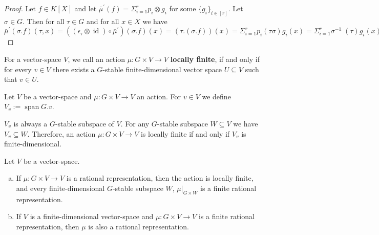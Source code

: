 \begin{proof}
  Let $f \in K[X]$ and let $ \bar{\mu}^\prime (f) = \Sigma_{i=1}^r p_i \otimes g_i$ for some $\{g_i\}_{i \in [r]}$.
  Let $\sigma \in G$.
  Then for all $\tau \in G$ and for all $x \in X$ we have $ \bar{\mu}^\prime (\sigma.f) (\tau,x) = ((\epsilon_\tau \otimes \operatorname{id}) \circ \bar{\mu}^\prime) (\sigma.f) (x) = (\tau.(\sigma.f)) (x) = \Sigma_{i=1}^r p_i(\tau\sigma) g_i(x) = \Sigma_{i=1}^r \sigma^{-1}\dot{\phantom{.}}(\tau) g_i(x) = (\Sigma_{i=1}^r \sigma^{-1} \dot{\phantom{.}}p_i \otimes g_i) (\tau,x)$
\end{proof}

\begin{definition}
  For a vector-space $V$, we call an action $\mu \colon G \times V \longrightarrow V$ \textbf{locally finite}, if and only if for every $v \in V$ there exists a $G$-stable finite-dimensional vector space $U \subseteq V$ such that $v \in U$.
\end{definition}

\begin{definition}
  Let $V$ be a vector-space and $\mu \colon G \times V \longrightarrow V$ an action.
  For $v \in V$ we define $V_v := \operatorname{span} G.v$.
\end{definition}

\begin{remark}
  $V_v$ is always a $G$-stable subspace of $V$.
  For any $G$-stable subspace $W \subseteq V$ we have $V_v \subseteq W$.
  Therefore, an action $\mu \colon G \times V \longrightarrow V$ is locally finite if and only if $V_v$ is finite-dimensional.
\end{remark}

\begin{proposition}\label{locfin}
  Let $V$ be a vector-space.
  \begin{enumerate}[(a)]
  \item If $\mu \colon G \times V \longrightarrow V$ is a rational
    representation, then the action is locally finite, and every
    finite-dimensional $G$-stable subspace $W$,
    $\left. \mu \right|_{G\times W}$ is a finite rational
    representation.
  \item If $V$ is a finite-dimensional vector-space and $\mu \colon G \times V \longrightarrow V$ is a finite rational representation, then $\mu$ is also a rational representation.
  \end{enumerate}
\end{proposition}

